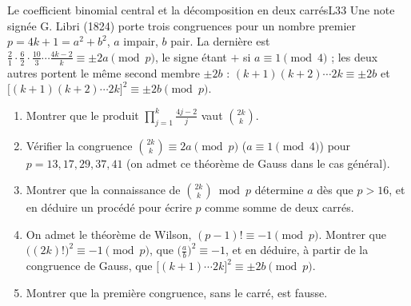 \documentclass[11pt,a4paper]{article}
\begin{document}
\begin{exercice}{Le coefficient binomial central et la décomposition en deux carrés}{L3}{3}
Une note signée G. Libri (1824) porte trois congruences pour un nombre premier
$p = 4k + 1 = a^2 + b^2$, $a$ impair, $b$ pair. La dernière est
$\frac21\cdot\frac62\cdot\frac{10}{3}\cdots\frac{4k-2}{k} \equiv \pm2a \pmod p$, le signe
étant $+$ si $a \equiv 1 \pmod 4$ ; les deux autres portent le même second membre
$\pm 2b$ : $(k+1)(k+2)\cdots 2k \equiv \pm 2b$ et
$\bigl[(k+1)(k+2)\cdots2k\bigr]^2 \equiv \pm 2b \pmod p$.
\begin{enumerate}
\item Montrer que le produit $\prod_{j=1}^k\frac{4j-2}{j}$ vaut $\binom{2k}{k}$.
\item Vérifier la congruence $\binom{2k}{k} \equiv 2a \pmod p$ ($a \equiv 1 \pmod 4$) pour
  $p = 13, 17, 29, 37, 41$ (on admet ce théorème de Gauss dans le cas général).
\item Montrer que la connaissance de $\binom{2k}{k} \bmod p$ détermine $a$ dès que
  $p > 16$, et en déduire un procédé pour écrire $p$ comme somme de deux carrés.
\item On admet le théorème de Wilson, $(p-1)! \equiv -1 \pmod p$. Montrer que
  $\bigl((2k)!\bigr)^2 \equiv -1 \pmod p$, que $\bigl(\frac ab\bigr)^2 \equiv -1$, et
  en déduire, à partir de la congruence de Gauss, que
  $\bigl[(k+1)\cdots 2k\bigr]^2 \equiv \pm 2b \pmod p$.
\item Montrer que la première congruence, sans le carré, est fausse.
\end{enumerate}
\end{exercice}
\end{document}
